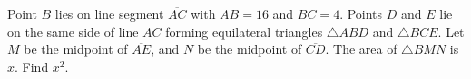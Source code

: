 Point $B$ lies on line segment $\overline{AC}$ with $AB=16$ and $BC=4$. Points $D$ and $E$ lie on the same side of line $AC$ forming equilateral triangles $\triangle ABD$ and $\triangle BCE$. Let $M$ be the midpoint of $\overline{AE}$,  and $N$ be the midpoint of $\overline{CD}$. The area of $\triangle BMN$ is $x$. Find $x^2$.